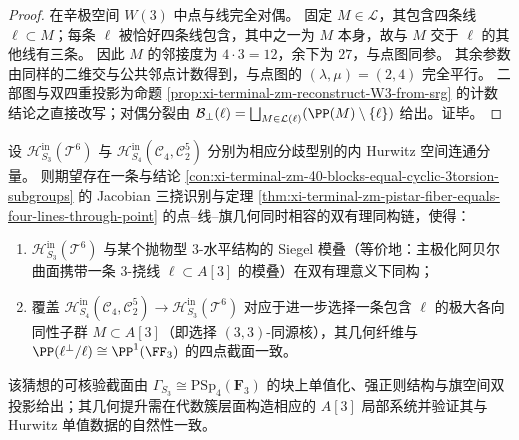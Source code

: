 \begin{proof}
在辛极空间 \(W(3)\) 中点与线完全对偶。
固定 \(M\in\mathcal L\)，其包含四条线 \(\ell\subset M\)；每条 \(\ell\) 被恰好四条线包含，其中之一为 \(M\) 本身，故与 \(M\) 交于 \(\ell\) 的其他线有三条。
因此 \(M\) 的邻接度为 \(4\cdot 3=12\)，余下为 \(27\)，与点图同参。
其余参数由同样的二维交与公共邻点计数得到，与点图的 \((\lambda,\mu)=(2,4)\) 完全平行。
二部图与双四重投影为命题 \ref{prop:xi-terminal-zm-reconstruct-W3-from-srg} 的计数结论之直接改写；对偶分裂由
\(
\mathcal B_\perp(\ell)=\bigsqcup_{M\in\mathcal L(\ell)}(\PP(M)\setminus\{\ell\})
\)
给出。证毕。
\end{proof}

\begin{conjecture}\label{conj:xi-terminal-zm-hurwitz-parabolic-level3-moduli}
设 \(\mathcal H_{S_3}^{\mathrm{in}}(\mathcal T^6)\) 与 \(\mathcal H_{S_4}^{\mathrm{in}}(\mathcal C_4,\mathcal C_2^5)\) 分别为相应分歧型别的内 Hurwitz 空间连通分量。
则期望存在一条与结论 \ref{con:xi-terminal-zm-40-blocks-equal-cyclic-3torsion-subgroups} 的 Jacobian 三挠识别与定理 \ref{thm:xi-terminal-zm-pistar-fiber-equals-four-lines-through-point} 的点–线–旗几何同时相容的双有理同构链，使得：
\begin{enumerate}
  \item \(\mathcal H_{S_3}^{\mathrm{in}}(\mathcal T^6)\) 与某个抛物型 \(3\)-水平结构的 Siegel 模叠（等价地：主极化阿贝尔曲面携带一条 \(3\)-挠线 \(\ell\subset A[3]\) 的模叠）在双有理意义下同构；
  \item 覆盖 \(\mathcal H_{S_4}^{\mathrm{in}}(\mathcal C_4,\mathcal C_2^5)\to \mathcal H_{S_3}^{\mathrm{in}}(\mathcal T^6)\) 对应于进一步选择一条包含 \(\ell\) 的极大各向同性子群 \(M\subset A[3]\)（即选择 \((3,3)\)-同源核），其几何纤维与 \(\PP(\ell^\perp/\ell)\cong \PP^1(\FF_3)\) 的四点截面一致。
\end{enumerate}
该猜想的可核验截面由 \(\Gamma_{S_3}\cong \mathrm{PSp}_4(\mathbf F_3)\) 的块上单值化、强正则结构与旗空间双投影给出；其几何提升需在代数簇层面构造相应的 \(A[3]\) 局部系统并验证其与 Hurwitz 单值数据的自然性一致。
\end{conjecture}

